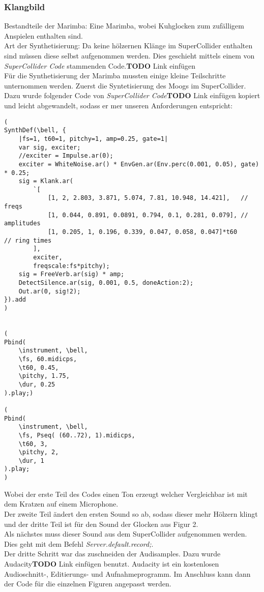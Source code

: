 \documentclass[
10pt, %
a4paper, %
oneside, %
headinclude,footinclude, %
BCOR5mm, %
]{scrartcl}
\begin{document}
\subsubsection{Klangbild}
Bestandteile der Marimba: Eine Marimba, wobei Kuhglocken zum zufälligem Anspielen enthalten sind.\\
Art der Synthetisierung: Da keine hölzernen Klänge im SuperCollider enthalten sind müssen diese selbst aufgenommen werden. Dies geschieht mittels 
einem von \textit{SuperCollider Code} stammenden Code.{\color{red}\textbf{TODO}} Link einfügen\\
Für die Synthetisierung der Marimba mussten einige kleine Teilschritte unternommen werden. Zuerst die Syntetisierung des Moogs im SuperCollider.\\
Dazu wurde folgender Code von \textit{SuperCollider Code}{\color{red}\textbf{TODO}} Link einfügen kopiert und leicht abgewandelt, sodass er mer unseren Anforderungen entspricht:
\begin{lstlisting}
(
SynthDef(\bell, {
	|fs=1, t60=1, pitchy=1, amp=0.25, gate=1|
	var sig, exciter;
	//exciter = Impulse.ar(0);
	exciter = WhiteNoise.ar() * EnvGen.ar(Env.perc(0.001, 0.05), gate) * 0.25;
	sig = Klank.ar(
		`[
			[1, 2, 2.803, 3.871, 5.074, 7.81, 10.948, 14.421],   // freqs
			[1, 0.044, 0.891, 0.0891, 0.794, 0.1, 0.281, 0.079], // amplitudes
			[1, 0.205, 1, 0.196, 0.339, 0.047, 0.058, 0.047]*t60     // ring times
		],
		exciter,
		freqscale:fs*pitchy);
	sig = FreeVerb.ar(sig) * amp;
	DetectSilence.ar(sig, 0.001, 0.5, doneAction:2);
	Out.ar(0, sig!2);
}).add
)


(
Pbind(
	\instrument, \bell,
	\fs, 60.midicps,
	\t60, 0.45,
	\pitchy, 1.75,
	\dur, 0.25
).play;)

(
Pbind(
	\instrument, \bell,
	\fs, Pseq( (60..72), 1).midicps,
	\t60, 3,
	\pitchy, 2,
	\dur, 1
).play;
)

\end{lstlisting}
Wobei der erste Teil des Codes einen Ton erzeugt welcher Vergleichbar ist mit dem Kratzen auf einem Microphone.\\
Der zweite Teil ändert den ersten Sound so ab, sodass dieser mehr Hölzern klingt und der dritte Teil ist für den Sound der Glocken aus Figur 2.\\
Als nächstes muss dieser Sound aus dem SuperCollider aufgenommen werden. Dies geht mit dem Befehl \textit{Server.default.record;}.\\
Der dritte Schritt war das zuschneiden der Audisamples. Dazu wurde Audacity{\color{red}\textbf{TODO}} Link einfügen benutzt. Audacity ist ein kostenlosen Audioschnitt-, Editierungs- und Aufnahmeprogramm. Im Anschluss kann dann der Code für die einzelnen Figuren angepasst werden.\\
\end{document}
